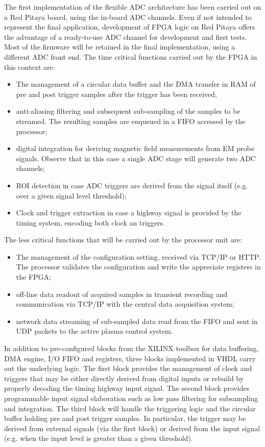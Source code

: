 The first implementation of the flexible ADC architecture has been carried out on a Red Pitaya board, using the in-board ADC channels. Even if not intended to represent the final application, development of FPGA logic on Red Pitaya offers the advantage of a ready-to-use ADC channel for development and first tests. Most of the firmware will be retained in the final implementation, using a different ADC front end. 
%
The time critical functions carried out by the FPGA in this context are:
\begin{itemize}
\item The management of a circular data buffer and the DMA transfer in RAM of pre and post trigger samples after the trigger has been received;
\item anti-aliasing filtering and subsequent sub-sampling of the samples to be streamed. The resulting samples are enqueued in a FIFO accessed by the processor;
\item digital integration for deriving magnetic field measurements from EM probe signals. Observe that in this case a single ADC stage will generate two ADC channels;
\item ROI detection in case ADC triggers are derived from the signal itself (e.g. over a given signal level threshold);
\item Clock and trigger extraction in case a highway signal is provided by the timing system, encoding both clock an triggers.
\end{itemize}
%
The less critical functions that will be carried out by the processor unit are:
\begin{itemize}
\item The management of the configuration setting, received via TCP/IP or HTTP. The processor validates the configuration and write the appreciate registers in the FPGA;
\item off-line data readout of acquired samples in transient recording and communication via TCP/IP with the central data acquisition system;
\item network data streaming of sub-sampled data read from the FIFO and sent in UDP packets to the active plasma control system. 
\end{itemize}
%
In addition to pre-configured blocks from the XILINX toolbox for data buffering, DMA engine, I/O FIFO and registers, three blocks implemented in VHDL carry out the underlying logic. The first block provides the management of clock and triggers that may be either directly derived from digital inputs or rebuild by properly decoding the timing highway input signal. The second block provides programmable input signal elaboration such as low pass filtering for subsampling and integration. The third block will handle the triggering logic and the circular buffer holding pre and post trigger samples. In particular, the trigger may be derived from external signals (via the first block) or derived from the input signal (e.g. when the input level is greater than a given threshold).    

